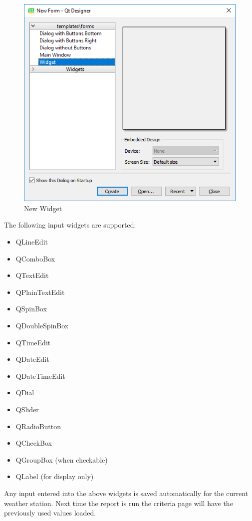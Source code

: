 \documentclass[a4paper,10pt]{book}
\begin{document}
\begin {figure}[!ht]
 \centering
 \includegraphics[scale=0.5]{images/new_widget}
 \caption{New Widget}
 \label{img_new_widget}
\end {figure}

The following input widgets are supported:
\begin{itemize}
\item QLineEdit
\item QComboBox
\item QTextEdit
\item QPlainTextEdit
\item QSpinBox
\item QDoubleSpinBox
\item QTimeEdit
\item QDateEdit
\item QDateTimeEdit
\item QDial
\item QSlider
\item QRadioButton
\item QCheckBox
\item QGroupBox (when checkable)
\item QLabel (for display only)
\end{itemize}

Any input entered into the above widgets is saved automatically for the current weather station. Next time the report is run the criteria page will have the previously used values loaded.
\end{document}
